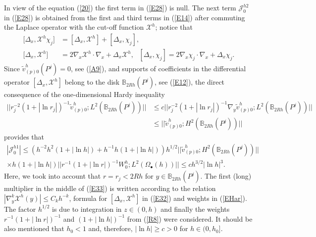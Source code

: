 \documentclass[11pt]{article}%
\numberwithin{equation}{section}
\begin{document}
In view of the equation (\ref{20}) the first term in (\ref{E28}) is null. The
next term $\mathcal{J}_{0}^{h2}$ in (\ref{E28}) is obtained from the first and
third terms in (\ref{E14}) after commuting the Laplace operator with the
cut-off function $\mathcal{X}^{h}$; notice that%
\begin{align}
\lbrack\Delta_{x},\mathcal{X}^{h}\chi_{j}]  &  =[\Delta_{x},\mathcal{X}%
^{h}]+[\Delta_{x},\chi_{j}],\label{E32}\\
\lbrack\Delta_{x},\mathcal{X}^{h}]  &  =2\nabla_{x}\mathcal{X}^{h}\cdot
\nabla_{x}+\Delta_{x}\mathcal{X}^{h},\ \ \ [\Delta_{x},\chi_{j}]=2\nabla
_{x}\chi_{j}\cdot\nabla_{x}+\Delta_{x}\chi_{j}.\nonumber
\end{align}
Since $\widetilde{v}_{(p)0}^{h}(P^{j})=0$, see (\ref{A9}), and supports of
coefficients in the differential operator $[\Delta_{x},\mathcal{X}^{h}]$
belong to the disk $\mathbb{B}_{2Rh}(P^{j})$, see (\ref{E12}), the direct
consequence of the one-dimensional Hardy inequality%
\begin{align}
||r_{j}^{-2}(1+|\ln r_{j}|)^{-1}\widetilde{v}_{(p)0}^{h};L^{2}(\mathbb{B}%
_{2Rh}(P^{j}))||  &  \leq c||r_{j}^{-2}(1+|\ln r_{j}|)^{-1}\nabla
_{y}\widetilde{v}_{(p)0}^{h};L^{2}(\mathbb{B}_{2Rh}(P^{j}))||\label{EHar}\\
&  \leq||\widetilde{v}_{(p)0}^{h};H^{2}(\mathbb{B}_{2Rh}(P^{j}))||\nonumber
\end{align}
provides that%
\begin{gather}
|\mathcal{J}_{0}^{h1}|\leq(h^{-2}h^{2}(1+|\ln h|)+h^{-1}h(1+|\ln
h|))h^{1/2}||\widetilde{v}_{(p)0}^{h};H^{2}(\mathbb{B}_{2Rh}(P^{j}%
))||\label{E33}\\
\times h(1+|\ln h|)||r^{-1}(1+|\ln r|)^{-1}W_{0}^{h};L^{2}(\Omega_{\bullet
}(h))||\leq ch^{3/2}|\ln h|^{3}.\nonumber
\end{gather}
Here, we took into account that $r=r_{j}<2Rh$ for $y\in\mathbb{B}_{2Rh}%
(P^{j})$. The first (long) multiplier in the middle of (\ref{E33}) is written
according to the relation $|\nabla_{y}^{k}\mathcal{X}^{h}(y)|\leq C_{k}h^{-k}%
$, formula for $[\Delta_{x},\mathcal{X}^{h}]$ in (\ref{E32}) and weights in
(\ref{EHar}). The factor $h^{1/2}$ is due to integration in $z\in(0,h)$ and
finally the weights $r^{-1}(1+|\ln r|)^{-1}$ and $(1+|\ln h|)^{-1}$ from
(\ref{R8}) were considered. It should be also mentioned that $h_{0}<1$ and,
therefore, $|\ln h|\geq c>0$ for $h\in(0,h_{0}]$.
\end{document}
